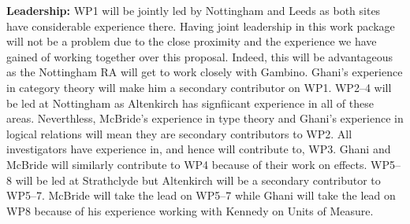 \documentclass[a4paper,11pt]{article}
\begin{document}
{\bf Leadership:} WP1 will be jointly led by Nottingham and Leeds as
both sites have considerable experience there. Having joint leadership
in this work package will not be a problem due to the close proximity
and the experience we have gained of working together over this
proposal. Indeed, this will be advantageous as the Nottingham RA will
get to work closely with Gambino. Ghani's experience in category
theory will make him a secondary contributor on WP1. WP2--4 will be led
at Nottingham as Altenkirch has signfiicant experience in all of these
areas. Neverthless, McBride's experience in type theory and Ghani's
experience in logical relations will mean they are secondary
contributors to WP2. All investigators have experience in, and hence
will contribute to, WP3. Ghani and McBride will similarly contribute
to WP4 because of their work on effects. WP5--8 will be led at
Strathclyde but Altenkirch will be a secondary contributor to
WP5--7. McBride will take the lead on WP5--7 while Ghani will take
the lead on WP8 because of his experience working with Kennedy on
Units of Measure.
\end{document}
